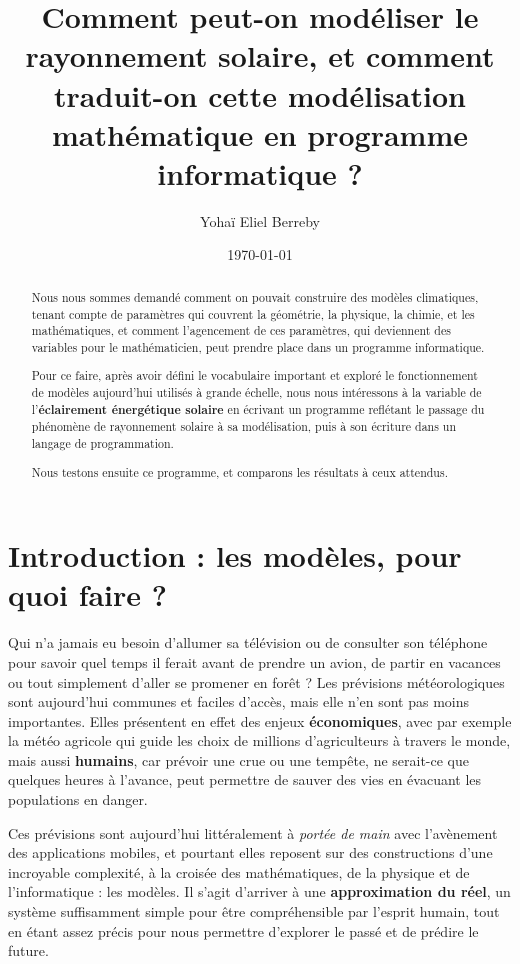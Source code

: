 \documentclass[12pt]{article}
\begin{document}
\author{Yohaï Eliel Berreby} %
\title{Comment peut-on modéliser le rayonnement solaire, et comment traduit-on cette modélisation mathématique en programme informatique ?}
\date{\today{}} %
\maketitle{} %
\begin{abstract}
Nous nous sommes demandé comment on pouvait construire des modèles climatiques, tenant compte de paramètres qui couvrent la géométrie, la physique, la chimie, et les mathématiques, et comment l’agencement de ces paramètres, qui deviennent des variables pour le mathématicien, peut prendre place dans un programme informatique.

Pour ce faire, après avoir défini le vocabulaire important et exploré le fonctionnement de modèles aujourd'hui utilisés à grande échelle, nous nous intéressons à la variable de l'\textbf{éclairement énergétique solaire} en écrivant un programme reflétant le passage du phénomène de rayonnement solaire à sa modélisation, puis à son écriture dans un langage de programmation.

Nous testons ensuite ce programme, et comparons les résultats à ceux attendus.
\end{abstract}


\clearpage
\tableofcontents{} %

\clearpage
\section{Introduction : les modèles, pour quoi faire ?} 
Qui n'a jamais eu besoin d'allumer sa télévision ou de consulter son téléphone pour savoir quel temps il ferait avant de prendre un avion, de partir en vacances ou tout simplement d'aller se promener en forêt ? Les prévisions météorologiques sont aujourd'hui communes et faciles d'accès, mais elle n'en sont pas moins importantes. Elles présentent en effet des enjeux \textbf{économiques}, avec par exemple la météo agricole qui guide les choix de millions d'agriculteurs à travers le monde, mais aussi \textbf{humains}, car prévoir une crue ou une tempête, ne serait-ce que quelques heures à l'avance, peut permettre de sauver des vies en évacuant les populations en danger.

Ces prévisions sont aujourd'hui littéralement à \textit{portée de main} avec l'avènement des applications mobiles, et pourtant elles reposent sur des constructions d'une incroyable complexité, à la croisée des mathématiques, de la physique et de l'informatique : les modèles.
Il s'agit d'arriver à une \textbf{approximation du réel}, un système suffisamment simple pour être compréhensible par l'esprit humain, tout en étant assez précis pour nous permettre d'explorer le passé et de prédire le future.
\end{document}
